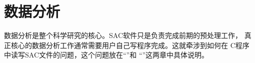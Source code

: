 \section{数据分析}
数据分析是整个科学研究的核心。SAC软件只是负责完成前期的预处理工作，
真正核心的数据分析工作通常需要用户自己写程序完成。这就牵涉到如何在
C程序中读写SAC文件的问题，这个问题放在``''和
``''这两章中具体说明。
